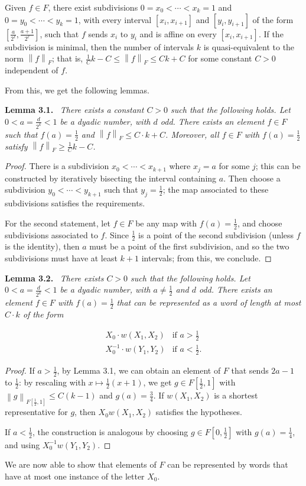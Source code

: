 \documentclass[10pt,a4paper]{article}
\newcommand{\norm}[1]{\left\lVert#1\right\rVert}
\newcommand{\sourcepagenumber}{editorial cover}
\newcommand{\SourcePage}[1]{\clearpage\gdef\sourcepagenumber{#1}}
\newenvironment{authorstatement}[1]{\par\medskip\noindent\textbf{#1}\ \itshape}{\par\medskip}
\begin{document}
Given $f\in F$, there exist subdivisions $0=x_0<\cdots<x_k=1$ and $0=y_0<\cdots<y_k=1$, with every interval $[x_i,x_{i+1}]$ and $[y_i,y_{i+1}]$ of the form $[\frac a{2^\ell},\frac{a+1}{2^\ell}]$, such that $f$ sends $x_i$ to $y_i$ and is affine on every $[x_i,x_{i+1}]$. If the subdivision is minimal, then the number of intervals $k$ is quasi-equivalent to the norm $\norm{f}_F$; that is, $\frac1Ck-C\le\norm{f}_F\le Ck+C$ for some constant $C>0$ independent of $f$.

From this, we get the following lemmas.
\begin{authorstatement}{Lemma 3.1.}
There exists a constant $C>0$ such that the following holds. Let $0<a=\frac d{2^k}<1$ be a dyadic number, with $d$ odd. There exists an element $f\in F$ such that $f(a)=\frac12$ and $\norm{f}_F\le C\cdot k+C$. Moreover, all $f\in F$ with $f(a)=\frac12$ satisfy $\norm{f}_F\ge\frac1Ck-C$.
\end{authorstatement}
\begin{proof}
There is a subdivision $x_0<\cdots<x_{k+1}$ where $x_j=a$ for some $j$; this can be constructed by iteratively bisecting the interval containing $a$. Then choose a subdivision $y_0<\cdots<y_{k+1}$ such that $y_j=\frac12$; the map associated to these subdivisions satisfies the requirements.

For the second statement, let $f\in F$ be any map with $f(a)=\frac12$, and choose subdivisions associated to $f$. Since $\frac12$ is a point of the second subdivision (unless $f$ is the identity), then $a$ must be a point of the first subdivision, and so the two subdivisions must have at least $k+1$ intervals; from this, we conclude.
\end{proof}
\begin{authorstatement}{Lemma 3.2.}
There exists $C>0$ such that the following holds. Let $0<a=\frac d{2^k}<1$ be a dyadic number, with $a\ne\frac12$ and $d$ odd. There exists an element $f\in F$ with $f(a)=\frac12$ that can be represented as a word of length at most $C\cdot k$ of the form
\end{authorstatement}
\SourcePage{6}
\[
\begin{array}{ll}
X_0\cdot w(X_1,X_2)&\text{if }a>\frac12\\
X_0^{-1}\cdot w(Y_1,Y_2)&\text{if }a<\frac12.
\end{array}
\]
\begin{proof}
If $a>\frac12$, by Lemma 3.1, we can obtain an element of $F$ that sends $2a-1$ to $\frac12$: by rescaling with $x\mapsto\frac12(x+1)$, we get $g\in F[\frac12,1]$ with $\norm{g}_{F[\frac12,1]}\le C(k-1)$ and $g(a)=\frac34$. If $w(X_1,X_2)$ is a shortest representative for $g$, then $X_0w(X_1,X_2)$ satisfies the hypotheses.

If $a<\frac12$, the construction is analogous by choosing $g\in F[0,\frac12]$ with $g(a)=\frac14$, and using $X_0^{-1}w(Y_1,Y_2)$.
\end{proof}
We are now able to show that elements of $F$ can be represented by words that have at most one instance of the letter $X_0$.
\end{document}
